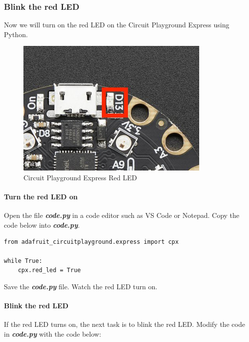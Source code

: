 \documentclass[11pt]{article}
\makeatletter
\def\maxwidth{\ifdim\Gin@nat@width>\linewidth\linewidth
    \else\Gin@nat@width\fi}
\let\Oldincludegraphics\includegraphics
\renewcommand{\includegraphics}[1]{\Oldincludegraphics[width=.8\maxwidth]{#1}}
\makeatother
\begin{document}
    \hypertarget{blink-the-red-led}{%
\subsubsection{Blink the red LED}\label{blink-the-red-led}}

Now we will turn on the red LED on the Circuit Playground Express using
Python.

\begin{figure}
\centering
\includegraphics{images/circuitpython_cpx_red_led.jpg}
\caption{Circuit Playground Express Red LED}
\end{figure}

\hypertarget{turn-the-red-led-on}{%
\paragraph{Turn the red LED on}\label{turn-the-red-led-on}}

Open the file \textbf{\emph{code.py}} in a code editor such as VS Code
or Notepad. Copy the code below into \textbf{\emph{code.py}}.

\begin{verbatim}
from adafruit_circuitplayground.express import cpx
     
while True:
    cpx.red_led = True
\end{verbatim}

Save the \textbf{\emph{code.py}} file. Watch the red LED turn on.

\hypertarget{blink-the-red-led-1}{%
\paragraph{Blink the red LED}\label{blink-the-red-led-1}}

If the red LED turns on, the next task is to blink the red LED. Modify
the code in \textbf{\emph{code.py}} with the code below:
\end{document}
